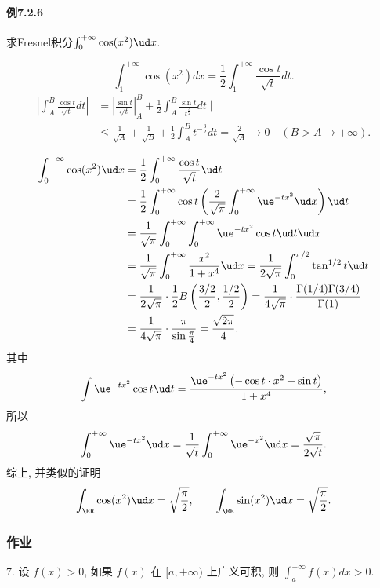 \paragraph{例7.2.6}

求Fresnel积分$\int_{0}^{+\infty}\cos(x^{2})\ud x$.

\[
\int_{1}^{+\infty}\cos\left(x^{2}\right)dx=\frac{1}{2}\int_{1}^{+\infty}\frac{\cos t}{\sqrt{t}}dt.
\]
\[
\begin{aligned}\left|\int_{A}^{B}\frac{\cos t}{\sqrt{t}}dt\right| & =\left|\frac{\sin t}{\sqrt{t}}\right|_{A}^{B}+\frac{1}{2}\int_{A}^{B}\frac{\sin t}{t^{\frac{3}{2}}}dt\mid\\
 & \leqslant\frac{1}{\sqrt{A}}+\frac{1}{\sqrt{B}}+\frac{1}{2}\int_{A}^{B}t^{-\frac{3}{2}}dt=\frac{2}{\sqrt{A}}\rightarrow0\quad(B>A\rightarrow+\infty).
\end{aligned}
\]

\begin{align*}
\int_{0}^{+\infty}\cos(x^{2})\ud x & =\frac{1}{2}\int_{0}^{+\infty}\frac{\cos t}{\sqrt{t}}\ud t\\
 & =\frac{1}{2}\int_{0}^{+\infty}\cos t\left(\frac{2}{\sqrt{\pi}}\int_{0}^{+\infty}\ue^{-tx^{2}}\ud x\right)\ud t\\
 & =\frac{1}{\sqrt{\pi}}\int_{0}^{+\infty}\int_{0}^{+\infty}\ue^{-tx^{2}}\cos t\ud t\ud x\\
 & =\frac{1}{\sqrt{\pi}}\int_{0}^{+\infty}\frac{x^{2}}{1+x^{4}}\ud x=\frac{1}{2\sqrt{\pi}}\int_{0}^{\pi/2}\tan^{1/2}t\ud t\\
 & =\frac{1}{2\sqrt{\pi}}\cdot\frac{1}{2}B\left(\frac{3/2}{2},\frac{1/2}{2}\right)=\frac{1}{4\sqrt{\pi}}\cdot\frac{\Gamma(1/4)\Gamma(3/4)}{\Gamma(1)}\\
 & =\frac{1}{4\sqrt{\pi}}\cdot\frac{\pi}{\sin\frac{\pi}{4}}=\frac{\sqrt{2\pi}}{4}.
\end{align*}
其中
\[
\int\ue^{-tx^{2}}\cos t\ud t=\frac{\ue^{-tx^{2}}\left(-\cos t\cdot x^{2}+\sin t\right)}{1+x^{4}},
\]
所以
\[
\int_{0}^{+\infty}\ue^{-tx^{2}}\ud x=\frac{1}{\sqrt{t}}\int_{0}^{+\infty}\ue^{-x^{2}}\ud x=\frac{\sqrt{\pi}}{2\sqrt{t}}.
\]
综上, 并类似的证明
\[
\int_{\RR}\cos(x^{2})\ud x=\sqrt{\frac{\pi}{2}},\qquad\int_{\RR}\sin(x^{2})\ud x=\sqrt{\frac{\pi}{2}}.
\]


\subsubsection{作业}

7. 设 $f(x)>0$, 如果 $f(x)$ 在 $[a,+\infty)$ 上广义可积, 则 $\int_{a}^{+\infty}f(x)dx>0$. 

